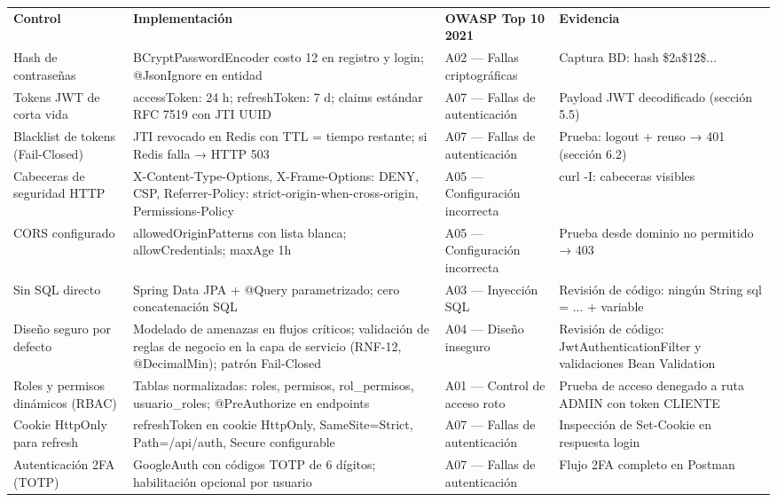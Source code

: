 \documentclass[
]{article}
\begin{document}
\begin{longtable}[]{@{}
  >{\raggedright\arraybackslash}p{}
  >{\raggedright\arraybackslash}p{}
  >{\raggedright\arraybackslash}p{}
  >{\raggedright\arraybackslash}p{}@{}}
\toprule\noalign{}
\endhead
\bottomrule\noalign{}
\endlastfoot
\textbf{Control} & \textbf{Implementación} & \textbf{OWASP Top 10 2021}
& \textbf{Evidencia} \\
Hash de contraseñas & BCryptPasswordEncoder costo 12 en registro y
login; @JsonIgnore en entidad & A02 --- Fallas criptográficas & Captura
BD: hash \$2a\$12\$... \\
Tokens JWT de corta vida & accessToken: 24 h; refreshToken: 7 d; claims
estándar RFC 7519 con JTI UUID & A07 --- Fallas de autenticación &
Payload JWT decodificado (sección 5.5) \\
Blacklist de tokens (Fail-Closed) & JTI revocado en Redis con TTL =
tiempo restante; si Redis falla → HTTP 503 & A07 --- Fallas de
autenticación & Prueba: logout + reuso → 401 (sección 6.2) \\
Cabeceras de seguridad HTTP & X-Content-Type-Options, X-Frame-Options:
DENY, CSP, Referrer-Policy: strict-origin-when-cross-origin,
Permissions-Policy & A05 --- Configuración incorrecta & curl -I:
cabeceras visibles \\
CORS configurado & allowedOriginPatterns con lista blanca;
allowCredentials; maxAge 1h & A05 --- Configuración incorrecta & Prueba
desde dominio no permitido → 403 \\
Sin SQL directo & Spring Data JPA + @Query parametrizado; cero
concatenación SQL & A03 --- Inyección SQL & Revisión de código: ningún
String sql = ... + variable \\
Diseño seguro por defecto & Modelado de amenazas en flujos críticos;
validación de reglas de negocio en la capa de servicio (RNF-12,
@DecimalMin); patrón Fail-Closed & A04 --- Diseño inseguro & Revisión de
código: JwtAuthenticationFilter y validaciones Bean Validation \\
Roles y permisos dinámicos (RBAC) & Tablas normalizadas: roles,
permisos, rol\_permisos, usuario\_roles; @PreAuthorize en endpoints &
A01 --- Control de acceso roto & Prueba de acceso denegado a ruta ADMIN
con token CLIENTE \\
Cookie HttpOnly para refresh & refreshToken en cookie HttpOnly,
SameSite=Strict, Path=/api/auth, Secure configurable & A07 --- Fallas de
autenticación & Inspección de Set-Cookie en respuesta login \\
Autenticación 2FA (TOTP) & GoogleAuth con códigos TOTP de 6 dígitos;
habilitación opcional por usuario & A07 --- Fallas de autenticación &
Flujo 2FA completo en Postman \\
\end{longtable}
\end{document}
